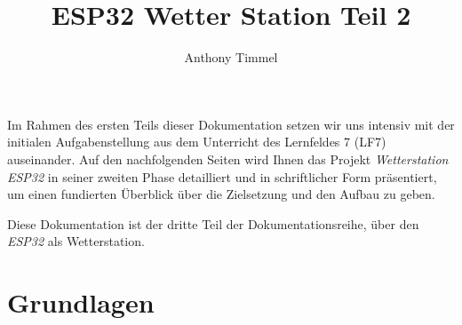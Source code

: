 \documentclass[9pt,a4paper]{report}
\title{ESP32 Wetter Station Teil 2}
\author{Anthony Timmel}
\begin{document}
	\maketitle
	\tableofcontents
	\cleardoublepage
	
	Im Rahmen des ersten Teils dieser Dokumentation setzen wir uns intensiv mit der initialen Aufgabenstellung aus dem Unterricht des Lernfeldes 7 (LF7) auseinander. Auf den nachfolgenden Seiten wird Ihnen das Projekt \textit{Wetterstation ESP32} in seiner zweiten Phase detailliert und in schriftlicher Form präsentiert, um einen fundierten Überblick über die Zielsetzung und den Aufbau zu geben.
	
	Diese Dokumentation ist der dritte Teil der Dokumentationsreihe, über den \textit{ESP32} als Wetterstation.
	
	\chapter{Grundlagen}
	
	
\end{document}
